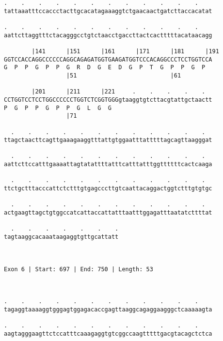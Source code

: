\documentclass{article}
\begin{document}
\begin{Verbatim}
.    .    .    .    .    .    .    .    .    .    .    .    
tattaaatttccaccctacttgcacatagaaaggtctgaacaactgatcttaccacatat
                                                            
.    .    .    .    .    .    .    .    .    .    .    .    
aattcttaggtttctacagggcctgtctaacctgaccttactcactttttacataacagg
                                                            
        |141      |151      |161      |171      |181      |191
GGTCCACCAGGCCCCCCAGGCAGAGATGGTGAAGATGGTCCCACAGGCCCTCCTGGTCCA
G  P  P  G  P  P  G  R  D  G  E  D  G  P  T  G  P  P  G  P  
                  |51                           |61         
  
        |201      |211      |221     .    .    .    .    .  
CCTGGTCCTCCTGGCCCCCCTGGTCTCGGTGGGgtaaggtgtcttacgtattgctaactt
P  G  P  P  G  P  P  G  L  G  G                             
                  |71                                       
  
  .    .    .    .    .    .    .    .    .    .    .    .  
ttagctaacttcagttgaaagaaggtttattgtggaatttatttttagcagttaagggat
                                                            
  .    .    .    .    .    .    .    .    .    .    .    .  
aattcttccatttgaaaattagtatattttatttcatttatttggttttttcactcaaga
                                                            
  .    .    .    .    .    .    .    .    .    .    .    .  
ttctgctttacccattctctttgtgagcccttgtcaattacaggactggtctttgtgtgc
                                                            
  .    .    .    .    .    .    .    .    .    .    .    .  
actgaagttagctgtggccatcattaccattatttaatttggagatttaatatcttttat
                                                            
  .    .    .    .    .    .    .
tagtaaggcacaaataagaggtgttgcattatt
                                 
                                 
 
Exon 6 | Start: 697 | End: 750 | Length: 53



.    .    .    .    .    .    .    .    .    .    .    .    
tagaggtaaaaggtgggagtggagacaccgagttaaggcagaggaagggctcaaaaagta
                                                            
.    .    .    .    .    .    .    .    .    .    .    .    
aagtagggaagttctccatttcaaagaggtgtcggccaagtttttgacgtacagctctca
                                                            

\end{Verbatim}
\end{document}
